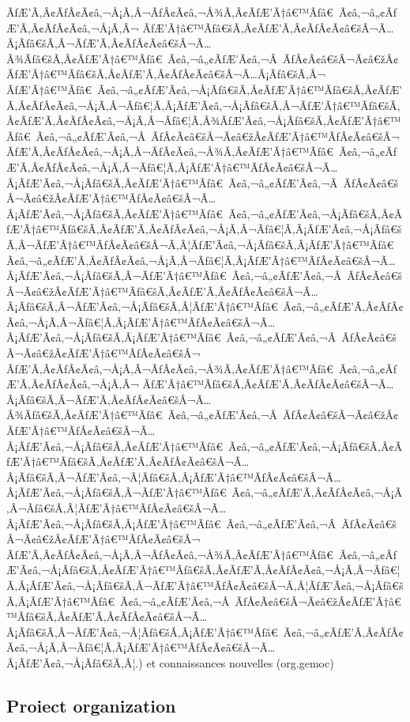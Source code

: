 \documentclass{gemoc} %
\begin{document}
ÃƒÆ’Ã‚Â¢ÃƒÂ¢Ã¢â‚¬Å¡Ã‚Â¬ÃƒÂ¢Ã¢â‚¬Å¾Ã‚Â¢ÃƒÆ’Ã†â€™Ãƒâ€ Ã¢â‚¬â„¢ÃƒÆ’Ã‚Â¢ÃƒÂ¢Ã¢â‚¬Å¡Ã‚Â¬ ÃƒÆ’Ã†â€™Ãƒâ€šÃ‚Â¢ÃƒÆ’Ã‚Â¢ÃƒÂ¢Ã¢â€šÂ¬Ã…Â¡Ãƒâ€šÃ‚Â¬ÃƒÆ’Ã‚Â¢ÃƒÂ¢Ã¢â€šÂ¬Ã…Â¾Ãƒâ€šÃ‚Â¢ÃƒÆ’Ã†â€™Ãƒâ€ Ã¢â‚¬â„¢ÃƒÆ’Ã¢â‚¬Â ÃƒÂ¢Ã¢â€šÂ¬Ã¢â€žÂ¢ÃƒÆ’Ã†â€™Ãƒâ€šÃ‚Â¢ÃƒÆ’Ã‚Â¢ÃƒÂ¢Ã¢â€šÂ¬Ã…Â¡Ãƒâ€šÃ‚Â¬ ÃƒÆ’Ã†â€™Ãƒâ€ Ã¢â‚¬â„¢ÃƒÆ’Ã¢â‚¬Å¡Ãƒâ€šÃ‚Â¢ÃƒÆ’Ã†â€™Ãƒâ€šÃ‚Â¢ÃƒÆ’Ã‚Â¢ÃƒÂ¢Ã¢â‚¬Å¡Ã‚Â¬Ãƒâ€¦Ã‚Â¡ÃƒÆ’Ã¢â‚¬Å¡Ãƒâ€šÃ‚Â¬ÃƒÆ’Ã†â€™Ãƒâ€šÃ‚Â¢ÃƒÆ’Ã‚Â¢ÃƒÂ¢Ã¢â‚¬Å¡Ã‚Â¬Ãƒâ€¦Ã‚Â¾ÃƒÆ’Ã¢â‚¬Å¡Ãƒâ€šÃ‚Â¢ÃƒÆ’Ã†â€™Ãƒâ€ Ã¢â‚¬â„¢ÃƒÆ’Ã¢â‚¬Â ÃƒÂ¢Ã¢â€šÂ¬Ã¢â€žÂ¢ÃƒÆ’Ã†â€™ÃƒÂ¢Ã¢â€šÂ¬ ÃƒÆ’Ã‚Â¢ÃƒÂ¢Ã¢â‚¬Å¡Ã‚Â¬ÃƒÂ¢Ã¢â‚¬Å¾Ã‚Â¢ÃƒÆ’Ã†â€™Ãƒâ€ Ã¢â‚¬â„¢ÃƒÆ’Ã‚Â¢ÃƒÂ¢Ã¢â‚¬Å¡Ã‚Â¬Ãƒâ€¦Ã‚Â¡ÃƒÆ’Ã†â€™ÃƒÂ¢Ã¢â€šÂ¬Ã…Â¡ÃƒÆ’Ã¢â‚¬Å¡Ãƒâ€šÃ‚Â¢ÃƒÆ’Ã†â€™Ãƒâ€ Ã¢â‚¬â„¢ÃƒÆ’Ã¢â‚¬Â ÃƒÂ¢Ã¢â€šÂ¬Ã¢â€žÂ¢ÃƒÆ’Ã†â€™ÃƒÂ¢Ã¢â€šÂ¬Ã…Â¡ÃƒÆ’Ã¢â‚¬Å¡Ãƒâ€šÃ‚Â¢ÃƒÆ’Ã†â€™Ãƒâ€ Ã¢â‚¬â„¢ÃƒÆ’Ã¢â‚¬Å¡Ãƒâ€šÃ‚Â¢ÃƒÆ’Ã†â€™Ãƒâ€šÃ‚Â¢ÃƒÆ’Ã‚Â¢ÃƒÂ¢Ã¢â‚¬Å¡Ã‚Â¬Ãƒâ€¦Ã‚Â¡ÃƒÆ’Ã¢â‚¬Å¡Ãƒâ€šÃ‚Â¬ÃƒÆ’Ã†â€™ÃƒÂ¢Ã¢â€šÂ¬Ã‚Â¦ÃƒÆ’Ã¢â‚¬Å¡Ãƒâ€šÃ‚Â¡ÃƒÆ’Ã†â€™Ãƒâ€ Ã¢â‚¬â„¢ÃƒÆ’Ã‚Â¢ÃƒÂ¢Ã¢â‚¬Å¡Ã‚Â¬Ãƒâ€¦Ã‚Â¡ÃƒÆ’Ã†â€™ÃƒÂ¢Ã¢â€šÂ¬Ã…Â¡ÃƒÆ’Ã¢â‚¬Å¡Ãƒâ€šÃ‚Â¬ÃƒÆ’Ã†â€™Ãƒâ€ Ã¢â‚¬â„¢ÃƒÆ’Ã¢â‚¬Â ÃƒÂ¢Ã¢â€šÂ¬Ã¢â€žÂ¢ÃƒÆ’Ã†â€™Ãƒâ€šÃ‚Â¢ÃƒÆ’Ã‚Â¢ÃƒÂ¢Ã¢â€šÂ¬Ã…Â¡Ãƒâ€šÃ‚Â¬ÃƒÆ’Ã¢â‚¬Å¡Ãƒâ€šÃ‚Â¦ÃƒÆ’Ã†â€™Ãƒâ€ Ã¢â‚¬â„¢ÃƒÆ’Ã‚Â¢ÃƒÂ¢Ã¢â‚¬Å¡Ã‚Â¬Ãƒâ€¦Ã‚Â¡ÃƒÆ’Ã†â€™ÃƒÂ¢Ã¢â€šÂ¬Ã…Â¡ÃƒÆ’Ã¢â‚¬Å¡Ãƒâ€šÃ‚Â¡ÃƒÆ’Ã†â€™Ãƒâ€ Ã¢â‚¬â„¢ÃƒÆ’Ã¢â‚¬Â ÃƒÂ¢Ã¢â€šÂ¬Ã¢â€žÂ¢ÃƒÆ’Ã†â€™ÃƒÂ¢Ã¢â€šÂ¬ ÃƒÆ’Ã‚Â¢ÃƒÂ¢Ã¢â‚¬Å¡Ã‚Â¬ÃƒÂ¢Ã¢â‚¬Å¾Ã‚Â¢ÃƒÆ’Ã†â€™Ãƒâ€ Ã¢â‚¬â„¢ÃƒÆ’Ã‚Â¢ÃƒÂ¢Ã¢â‚¬Å¡Ã‚Â¬ ÃƒÆ’Ã†â€™Ãƒâ€šÃ‚Â¢ÃƒÆ’Ã‚Â¢ÃƒÂ¢Ã¢â€šÂ¬Ã…Â¡Ãƒâ€šÃ‚Â¬ÃƒÆ’Ã‚Â¢ÃƒÂ¢Ã¢â€šÂ¬Ã…Â¾Ãƒâ€šÃ‚Â¢ÃƒÆ’Ã†â€™Ãƒâ€ Ã¢â‚¬â„¢ÃƒÆ’Ã¢â‚¬Â ÃƒÂ¢Ã¢â€šÂ¬Ã¢â€žÂ¢ÃƒÆ’Ã†â€™ÃƒÂ¢Ã¢â€šÂ¬Ã…Â¡ÃƒÆ’Ã¢â‚¬Å¡Ãƒâ€šÃ‚Â¢ÃƒÆ’Ã†â€™Ãƒâ€ Ã¢â‚¬â„¢ÃƒÆ’Ã¢â‚¬Å¡Ãƒâ€šÃ‚Â¢ÃƒÆ’Ã†â€™Ãƒâ€šÃ‚Â¢ÃƒÆ’Ã‚Â¢ÃƒÂ¢Ã¢â€šÂ¬Ã…Â¡Ãƒâ€šÃ‚Â¬ÃƒÆ’Ã¢â‚¬Â¦Ãƒâ€šÃ‚Â¡ÃƒÆ’Ã†â€™ÃƒÂ¢Ã¢â€šÂ¬Ã…Â¡ÃƒÆ’Ã¢â‚¬Å¡Ãƒâ€šÃ‚Â¬ÃƒÆ’Ã†â€™Ãƒâ€ Ã¢â‚¬â„¢ÃƒÆ’Ã‚Â¢ÃƒÂ¢Ã¢â‚¬Å¡Ã‚Â¬Ãƒâ€šÃ‚Â¦ÃƒÆ’Ã†â€™ÃƒÂ¢Ã¢â€šÂ¬Ã…Â¡ÃƒÆ’Ã¢â‚¬Å¡Ãƒâ€šÃ‚Â¡ÃƒÆ’Ã†â€™Ãƒâ€ Ã¢â‚¬â„¢ÃƒÆ’Ã¢â‚¬Â ÃƒÂ¢Ã¢â€šÂ¬Ã¢â€žÂ¢ÃƒÆ’Ã†â€™ÃƒÂ¢Ã¢â€šÂ¬ ÃƒÆ’Ã‚Â¢ÃƒÂ¢Ã¢â‚¬Å¡Ã‚Â¬ÃƒÂ¢Ã¢â‚¬Å¾Ã‚Â¢ÃƒÆ’Ã†â€™Ãƒâ€ Ã¢â‚¬â„¢ÃƒÆ’Ã¢â‚¬Å¡Ãƒâ€šÃ‚Â¢ÃƒÆ’Ã†â€™Ãƒâ€šÃ‚Â¢ÃƒÆ’Ã‚Â¢ÃƒÂ¢Ã¢â‚¬Å¡Ã‚Â¬Ãƒâ€¦Ã‚Â¡ÃƒÆ’Ã¢â‚¬Å¡Ãƒâ€šÃ‚Â¬ÃƒÆ’Ã†â€™ÃƒÂ¢Ã¢â€šÂ¬Ã‚Â¦ÃƒÆ’Ã¢â‚¬Å¡Ãƒâ€šÃ‚Â¡ÃƒÆ’Ã†â€™Ãƒâ€ Ã¢â‚¬â„¢ÃƒÆ’Ã¢â‚¬Â ÃƒÂ¢Ã¢â€šÂ¬Ã¢â€žÂ¢ÃƒÆ’Ã†â€™Ãƒâ€šÃ‚Â¢ÃƒÆ’Ã‚Â¢ÃƒÂ¢Ã¢â€šÂ¬Ã…Â¡Ãƒâ€šÃ‚Â¬ÃƒÆ’Ã¢â‚¬Â¦Ãƒâ€šÃ‚Â¡ÃƒÆ’Ã†â€™Ãƒâ€ Ã¢â‚¬â„¢ÃƒÆ’Ã‚Â¢ÃƒÂ¢Ã¢â‚¬Å¡Ã‚Â¬Ãƒâ€¦Ã‚Â¡ÃƒÆ’Ã†â€™ÃƒÂ¢Ã¢â€šÂ¬Ã…Â¡ÃƒÆ’Ã¢â‚¬Å¡Ãƒâ€šÃ‚Â¦.) et connaissances nouvelles (org.gemoc)
\subsection{Proiect organization}
\end{document}
